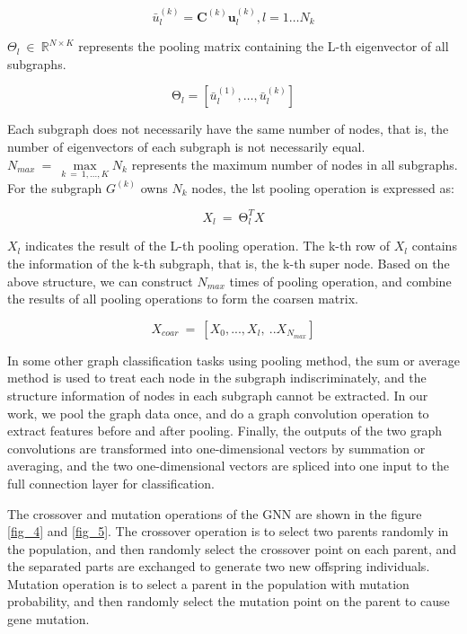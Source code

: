\documentclass[lettersize,journal]{IEEEtran}
\begin{document}
\begin{equation}
\label{deqn_ex_3}
{\bar{u}}_l^{(k)}=\mathbf{C}^{(k)}\mathbf{u}_l^{(k)},l=1\ldots N_k
\end{equation}

$\Theta_l\ \in\ \mathbb{R}^{N\times K}$ represents the pooling matrix containing the L-th eigenvector of all subgraphs.

\begin{equation}
\label{deqn_ex_4}
\mathrm{\Theta}_l=\left[{\bar{u}}_l^{\left(1\right)},\ldots,{\bar{u}}_l^{\left(k\right)}\right]
\end{equation}

Each subgraph does not necessarily have the same number of nodes, that is, the number of eigenvectors of each subgraph is not necessarily equal. $N_{max}\ =\ \underset{k\ =\ 1,...,K}\max{N_k}$ represents the maximum number of nodes in all subgraphs. For the subgraph $G^{(k)}$ owns $N_k$ nodes, the lst pooling operation is expressed as:

\begin{equation}
\label{deqn_ex_5}
X_l\ =\ \mathrm{\Theta}_l^TX
\end{equation}

$X_l$ indicates the result of the L-th pooling operation. The k-th row of $X_l$ contains the information of the k-th subgraph, that is, the k-th super node. Based on the above structure, we can construct $N_{max}$ times of pooling operation, and combine the results of all pooling operations to form the coarsen matrix.

\begin{equation}
\label{deqn_ex_6}
X_{coar}\ =\ [X_0,...,X_l,\ ..X_{N_{max}}]
\end{equation}

In some other graph classification tasks using pooling method, the sum or average method is used to treat each node in the subgraph indiscriminately, and the structure information of nodes in each subgraph cannot be extracted. In our work, we pool the graph data once, and do a graph convolution operation to extract features before and after pooling. Finally, the outputs of the two graph convolutions are transformed into one-dimensional vectors by summation or averaging, and the two one-dimensional vectors are spliced into one input to the full connection layer for classification. 

The crossover and mutation operations of the GNN are shown in the figure \ref{fig_4} and \ref{fig_5}. The crossover operation is to select two parents randomly in the population, and then randomly select the crossover point on each parent, and the separated parts are exchanged to generate two new offspring individuals. Mutation operation is to select a parent in the population with mutation probability, and then randomly select the mutation point on the parent to cause gene mutation.
\end{document}
